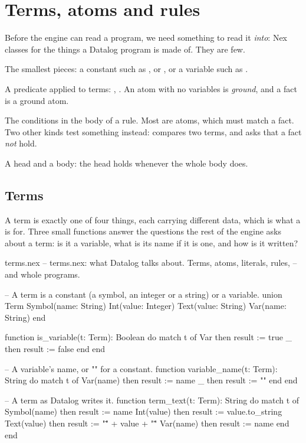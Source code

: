 \chapter{Terms, atoms and rules}\label{ch:terms}

Before the engine can read a program, we need something to read it
\emph{into}: Nex classes for the things a Datalog program is made of. They
are few.

\begin{description}[style=nextline, leftmargin=1.2em, itemsep=0.4em]
  \item[Terms.] The smallest pieces: a constant such as , 
    or , or a variable such as .
  \item[Atoms.] A predicate applied to terms: ,
    . An atom with no variables is \emph{ground}, and a
    fact is a ground atom.
  \item[Literals.] The conditions in the body of a rule. Most are atoms,
    which must match a fact. Two other kinds test something instead:
     compares two terms, and  asks that a
    fact \emph{not} hold.
  \item[Rules.] A head and a body: the head holds whenever the whole body
    does.
\end{description}

\section{Terms}

A term is exactly one of four things, each carrying different data, which
is what a  is for. Three small functions answer the questions
the rest of the engine asks about a term: is it a variable, what is its
name if it is one, and how is it written?

\begin{newfile}{terms.nex}
-- terms.nex: what Datalog talks about. Terms, atoms, literals, rules,
-- and whole programs.

-- A term is a constant (a symbol, an integer or a string) or a variable.
union Term
  Symbol(name: String)
  Int(value: Integer)
  Text(value: String)
  Var(name: String)
end

function is_variable(t: Term): Boolean
do
  match t of
    Var then result := true
    _   then result := false
  end
end

-- A variable's name, or "" for a constant.
function variable_name(t: Term): String
do
  match t of
    Var(name) then result := name
    _         then result := ""
  end
end

-- A term as Datalog writes it.
function term_text(t: Term): String
do
  match t of
    Symbol(name) then result := name
    Int(value)   then result := value.to_string
    Text(value)  then result := "\"" + value + "\""
    Var(name)    then result := name
  end
end
\end{newfile}

